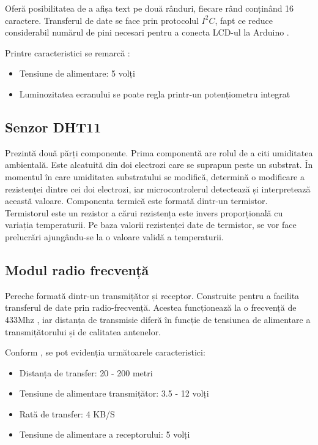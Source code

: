 	Oferă posibilitatea de a afișa text pe două rânduri, fiecare rând conținând 16 caractere. Transferul de date se face prin protocolul $I^2C$, fapt ce reduce considerabil numărul de pini necesari pentru a conecta LCD-ul la Arduino \cite{lcd}.

\vspace{1em}

	Printre caracteristici se remarcă \cite{lcd}:
 		\begin{itemize}
			\setlength{\itemindent}{2em}
			\itemsep0em
			\item Tensiune de alimentare: 5 volți 
			\item Luminozitatea ecranului se poate regla printr-un potențiometru integrat
		\end{itemize} 
	
\subsection{Senzor DHT11}

	Prezintă două părți componente. Prima componentă are rolul de a citi umiditatea ambientală. Este alcatuită din doi electrozi care se suprapun peste un substrat. În momentul în care umiditatea substratului se modifică, determină o modificare a rezistenței dintre cei doi electrozi, iar microcontrolerul detectează și interpretează această valoare. Componenta termică este formată dintr-un termistor. Termistorul este un rezistor a cărui rezistența este invers proporțională cu variația temperaturii. Pe baza valorii rezistenței date de termistor, se vor face prelucrări ajungându-se la o valoare validă a temperaturii.

\subsection{Modul radio frecvență}

	Pereche formată dintr-un transmițător și receptor. Construite pentru a facilita transferul de date prin radio-frecvență. Acestea funcționează la o frecvență de 433Mhz \cite{rfModule}, iar distanța de transmisie diferă în funcție de tensiunea de alimentare a transmițătorului și de calitatea antenelor.

	Conform \cite{rfModule}, se pot evidenția următoarele caracteristici:
 		\begin{itemize}
			\setlength{\itemindent}{2em}
			\itemsep0em
			\item Distanța de transfer: 20 - 200 metri
			\item Tensiune de alimentare transmițător: 3.5 - 12 volți
			\item Rată de transfer: 4 KB/S
			\item Tensiune de alimentare a receptorului: 5 volți
		\end{itemize} 

